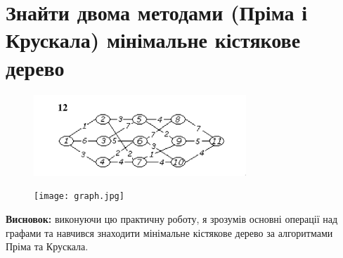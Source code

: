 \documentclass{article}
\begin{document}
{\section{Знайти двома методами (Пріма і Крускала) мінімальне кістякове дерево}
\begin{figure}[h]
	\centering
	\includegraphics[width=8cm]{4.png}
\end{figure}
\begin{figure}[h]
	\centering
	\texttt{[image: graph.jpg]}
\end{figure}

\newpage

\textbf{Висновок:}
виконуючи цю практичну роботу, я зрозумів основні операції над графами та навчився знаходити мінімальне кістякове дерево за алгоритмами Пріма та Крускала.
}
\end{document}

